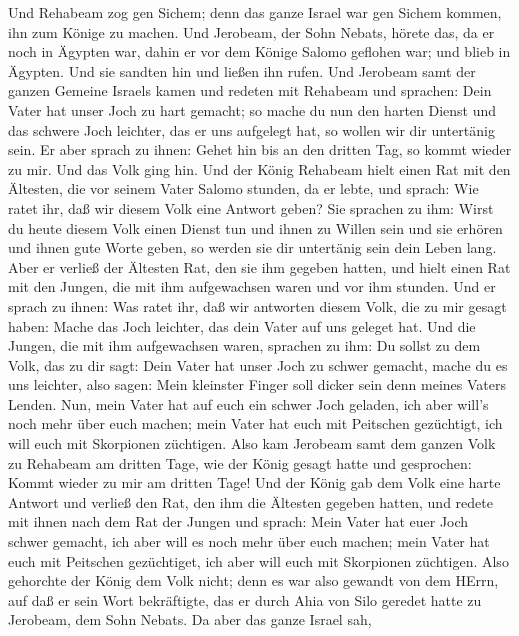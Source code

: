  Und Rehabeam zog gen Sichem; denn das ganze Israel war gen
Sichem kommen, ihn zum Könige zu machen.  Und Jerobeam, der
Sohn Nebats, hörete das, da er noch in Ägypten war, dahin er vor dem
Könige Salomo geflohen war; und blieb in Ägypten.  Und sie
sandten hin und ließen ihn rufen. Und Jerobeam samt der ganzen Gemeine
Israels kamen und redeten mit Rehabeam und sprachen:  Dein
Vater hat unser Joch zu hart gemacht; so mache du nun den harten Dienst
und das schwere Joch leichter, das er uns aufgelegt hat, so wollen wir
dir untertänig sein.  Er aber sprach zu ihnen: Gehet hin bis
an den dritten Tag, so kommt wieder zu mir. Und das Volk ging hin.
 Und der König Rehabeam hielt einen Rat mit den Ältesten,
die vor seinem Vater Salomo stunden, da er lebte, und sprach: Wie ratet
ihr, daß wir diesem Volk eine Antwort geben?  Sie sprachen
zu ihm: Wirst du heute diesem Volk einen Dienst tun und ihnen zu Willen
sein und sie erhören und ihnen gute Worte geben, so werden sie dir
untertänig sein dein Leben lang.  Aber er verließ der
Ältesten Rat, den sie ihm gegeben hatten, und hielt einen Rat mit den
Jungen, die mit ihm aufgewachsen waren und vor ihm stunden. 
Und er sprach zu ihnen: Was ratet ihr, daß wir antworten diesem Volk,
die zu mir gesagt haben: Mache das Joch leichter, das dein Vater auf uns
geleget hat.  Und die Jungen, die mit ihm aufgewachsen
waren, sprachen zu ihm: Du sollst zu dem Volk, das zu dir sagt: Dein
Vater hat unser Joch zu schwer gemacht, mache du es uns leichter, also
sagen: Mein kleinster Finger soll dicker sein denn meines Vaters Lenden.
 Nun, mein Vater hat auf euch ein schwer Joch geladen, ich
aber will's noch mehr über euch machen; mein Vater hat euch mit
Peitschen gezüchtigt, ich will euch mit Skorpionen züchtigen.
 Also kam Jerobeam samt dem ganzen Volk zu Rehabeam am
dritten Tage, wie der König gesagt hatte und gesprochen: Kommt wieder zu
mir am dritten Tage!  Und der König gab dem Volk eine harte
Antwort und verließ den Rat, den ihm die Ältesten gegeben hatten,
 und redete mit ihnen nach dem Rat der Jungen und sprach:
Mein Vater hat euer Joch schwer gemacht, ich aber will es noch mehr über
euch machen; mein Vater hat euch mit Peitschen gezüchtiget, ich aber
will euch mit Skorpionen züchtigen.  Also gehorchte der
König dem Volk nicht; denn es war also gewandt von dem HErrn, auf daß er
sein Wort bekräftigte, das er durch Ahia von Silo geredet hatte zu
Jerobeam, dem Sohn Nebats.  Da aber das ganze Israel sah,

